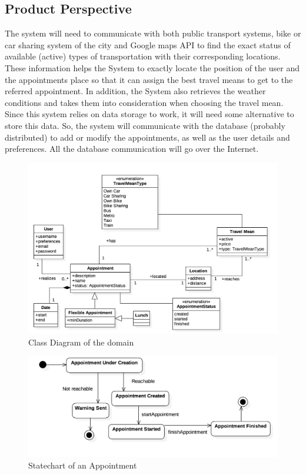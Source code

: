 \documentclass[12pt]{article}
\begin{document}
\subsection{Product Perspective}
The system will need to communicate with both public transport systems, bike or car sharing system of the city and Google maps API to find the exact status of available (active) types of transportation with their corresponding locations. These information helps the System to exactly locate the position of the user and the appointments place so that it can assign the best travel means to get to the referred appointment. In addition, the System also retrieves the weather conditions and takes them into consideration when choosing the travel mean.
Since this system relies on data storage to work, it will need some alternative to store this data. So, the system will communicate with the database (probably distributed) to add or modify the appointments, as well as the user details and preferences. All the database communication will go over the Internet.
    \begin{figure}[H]
        \includegraphics[scale=0.3]{domainModel.png}
        \caption{Class Diagram of the domain}
        \centering
    \label{fig:domainModel}
    \end{figure}
    \begin{figure}[H]
    \centering
        \includegraphics[scale=0.33]{statechartAppointment.png}
        \caption{Statechart of an Appointment}
    \label{fig:domainModel}
    \end{figure}
    
\end{document}
